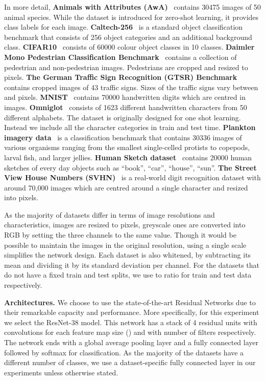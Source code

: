 \documentclass[10pt,twocolumn,letterpaper]{article}
\renewcommand{\paragraph}[1]{\par\medskip\noindent\textbf{#1}}
\begin{document}
In more detail, \textbf{Animals with Attributes (AwA)}~\cite{lampert2009learning} contains 30475 images of 50 animal species. While the dataset is introduced for zero-shot learning, it provides class labels for each image. \textbf{Caltech-256}~\cite{griffin2007caltech} is a standard object classification benchmark that consists of 256 object categories and an additional background class. \textbf{CIFAR10}~\cite{krizhevsky2009learning} consists of 60000  colour object classes in 10 classes. \textbf{Daimler Mono Pedestrian Classification Benchmark}~\cite{munder2006experimental} contains a collection of pedestrian and non-pedestrian images. Pedestrians are cropped and resized to  pixels. \textbf{The German Traffic Sign Recognition (GTSR) Benchmark}~\cite{Stallkamp2012} contains cropped images of 43 traffic signs. Sizes of the traffic signs vary between  and  pixels. \textbf{MNIST}~\cite{lecun1998mnist} contains 70000 handwritten digits which are centred in  images. \textbf{Omniglot}~\cite{lake2015human} consists of 1623 different handwritten characters from 50 different alphabets. The dataset is originally designed for one shot learning. Instead we include all the character categories in train and test time. \textbf{Plankton imagery data}~\cite{planktonv1} is a classification benchmark that contains 30336 images of various organisms ranging from the smallest single-celled protists to copepods, larval fish, and larger jellies. \textbf{Human Sketch dataset}~\cite{eitz2012hdhso} contains 20000 human sketches of every day objects such as ``book'', ``car'', ``house'', ``sun''. \textbf{The Street View House Numbers (SVHN)}~\cite{netzer2011reading} is a real-world digit recognition dataset with around 70,000 images which are centred around a single character and resized into  pixels.

As the majority of datasets differ in terms of image resolutions and characteristics, images are resized to  pixels, greyscale ones are converted into RGB by setting the three channels to the same value. Though it would be possible to maintain the images in the original resolution, using a single scale simplifies the network design. Each dataset is also whitened, by subtracting its mean and dividing it by its standard deviation per channel. For the datasets that do not have a fixed train and test splits, we use  to  ratio for train and test data respectively.

\paragraph{Architectures.} We choose to use the state-of-the-art Residual Networks \cite{he2016identity} due to their remarkable capacity and performance. More specifically, for this experiment we select the ResNet-38 model. This network has a stack of 4 residual units with  convolutions for each feature map size () and with number of filters  respectively. The network ends with a global average pooling layer and a fully connected layer followed by softmax for classification. As the majority of the datasets have a different number of classes, we use a dataset-specific fully connected layer in our experiments unless otherwise stated.
\end{document}
